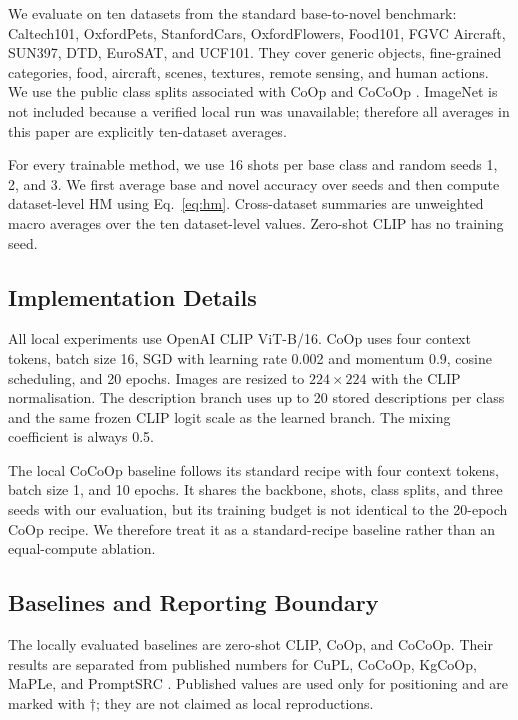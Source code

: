\documentclass[preprint,12pt]{elsarticle}
\begin{document}
We evaluate on ten datasets from the standard base-to-novel benchmark: Caltech101, OxfordPets, StanfordCars, OxfordFlowers, Food101, FGVC Aircraft, SUN397, DTD, EuroSAT, and UCF101. They cover generic objects, fine-grained categories, food, aircraft, scenes, textures, remote sensing, and human actions. We use the public class splits associated with CoOp and CoCoOp \cite{zhou2022coop,zhou2022cocoop}. ImageNet is not included because a verified local run was unavailable; therefore all averages in this paper are explicitly ten-dataset averages.

For every trainable method, we use 16 shots per base class and random seeds 1, 2, and 3. We first average base and novel accuracy over seeds and then compute dataset-level HM using Eq.~\eqref{eq:hm}. Cross-dataset summaries are unweighted macro averages over the ten dataset-level values. Zero-shot CLIP has no training seed.

\subsection{Implementation Details}

All local experiments use OpenAI CLIP ViT-B/16. CoOp uses four context tokens, batch size 16, SGD with learning rate 0.002 and momentum 0.9, cosine scheduling, and 20 epochs. Images are resized to $224\times224$ with the CLIP normalisation. The description branch uses up to 20 stored descriptions per class and the same frozen CLIP logit scale as the learned branch. The mixing coefficient is always 0.5.

The local CoCoOp baseline follows its standard recipe with four context tokens, batch size 1, and 10 epochs. It shares the backbone, shots, class splits, and three seeds with our evaluation, but its training budget is not identical to the 20-epoch CoOp recipe. We therefore treat it as a standard-recipe baseline rather than an equal-compute ablation.

\subsection{Baselines and Reporting Boundary}

The locally evaluated baselines are zero-shot CLIP, CoOp, and CoCoOp. Their results are separated from published numbers for CuPL, CoCoOp, KgCoOp, MaPLe, and PromptSRC \cite{pratt2023cupl,zhou2022cocoop,yao2023kgcoop,khattak2023maple,khattak2023promptsrc}. Published values are used only for positioning and are marked with $\dagger$; they are not claimed as local reproductions.
\end{document}
